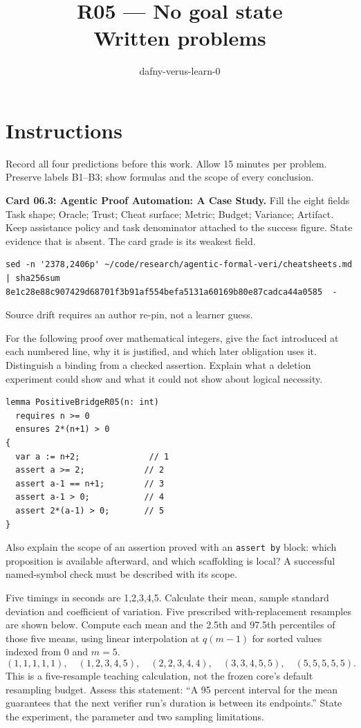 \documentclass[11pt]{article}
\title{R05 --- No goal state \\ \large Written problems}
\author{dafny-verus-learn-0}
\date{}
\begin{document}
\maketitle
\section*{Instructions}
Record all four predictions before this work. Allow 15 minutes per problem.
Preserve labels B1--B3; show formulas and the scope of every conclusion.
\begin{problem}\label{prob:B1}
\textbf{Card 06.3: Agentic Proof Automation: A Case Study.} Fill the eight
fields Task shape; Oracle; Trust; Cheat surface; Metric; Budget; Variance;
Artifact. Keep assistance policy and task denominator attached to the success
figure. State evidence that is absent. The card grade is its weakest field.
\begin{verbatim}
sed -n '2378,2406p' ~/code/research/agentic-formal-veri/cheatsheets.md | sha256sum
8e1c28e88c907429d68701f3b91af554befa5131a60169b80e87cadca44a0585  -
\end{verbatim}
Source drift requires an author re-pin, not a learner guess.
\end{problem}
\begin{problem}[proof]\label{prob:B2}
For the following proof over mathematical integers, give the fact introduced
at each numbered line, why it is justified, and which later obligation uses
it. Distinguish a binding from a checked assertion. Explain what a deletion
experiment could show and what it could not show about logical necessity.
\begin{verbatim}
lemma PositiveBridgeR05(n: int)
  requires n >= 0
  ensures 2*(n+1) > 0
{
  var a := n+2;              // 1
  assert a >= 2;            // 2
  assert a-1 == n+1;        // 3
  assert a-1 > 0;           // 4
  assert 2*(a-1) > 0;       // 5
}
\end{verbatim}
Also explain the scope of an assertion proved with an \texttt{assert by}
block: which proposition is available afterward, and which scaffolding is
local? A successful named-symbol check must be described with its scope.
\end{problem}
\begin{problem}[statistics]\label{prob:B3}
Five timings in seconds are 1,2,3,4,5. Calculate their mean, sample standard
deviation and coefficient of variation. Five prescribed with-replacement
resamples are shown below. Compute each mean and the 2.5th and 97.5th
percentiles of those five means, using linear interpolation at
$q(m-1)$ for sorted values indexed from 0 and $m=5$.
\[
 (1,1,1,1,1),\quad(1,2,3,4,5),\quad(2,2,3,4,4),\quad
 (3,3,4,5,5),\quad(5,5,5,5,5).
\]
This is a five-resample teaching calculation, not the frozen core's default
resampling budget. Assess this statement: ``A 95 percent interval for the mean
guarantees that the next verifier run's duration is between its endpoints.''
State the experiment, the parameter and two sampling limitations.
\end{problem}
\end{document}
